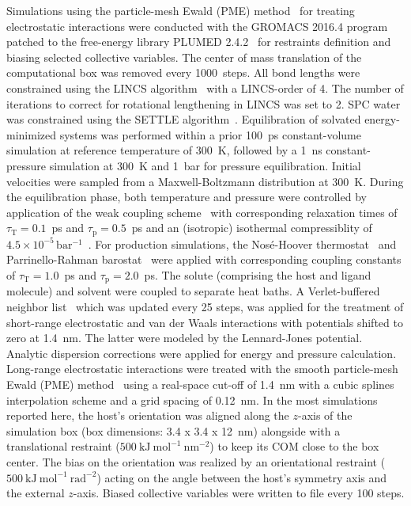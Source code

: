 \documentclass[9pt,lessons,pubversion]{livecoms}
\begin{document}
Simulations using the particle-mesh Ewald (PME) method~\cite{darden1993particle, essmann1995smooth} for treating electrostatic interactions were conducted with the 
GROMACS 2016.4 program~\cite{berendsen1995gromacs, hess2008gromacs, abraham2015gromacs} patched to the free-energy library 
PLUMED 2.4.2~\cite{tribello2014plumed} for restraints definition and biasing selected collective variables.
The center of mass translation of the computational box was removed every 1000~steps. 
All bond lengths were constrained using the LINCS algorithm~\cite{hess1997lincs, hess2008p} with a LINCS-order of 4. 
The number of iterations to correct for rotational lengthening in LINCS was set to 2.
SPC water was constrained using the SETTLE algorithm~\cite{miyamoto1992settle}.
Equilibration of solvated energy-minimized systems was performed within a prior 100~ps constant-volume simulation at reference temperature of 300~K, followed by a 1~ns constant-pressure simulation at 300~K and 1~bar for pressure equilibration.
Initial velocities were sampled from a Maxwell-Boltzmann distribution at 300~K.
During the equilibration phase, both temperature and pressure were controlled by application of the weak coupling scheme~\cite{berendsen1984molecular} with corresponding relaxation times of 
$\tau_\mathrm{T} = 0.1$~ps and $\tau_\mathrm{p} = 0.5$~ps and an (isotropic) isothermal compressiblity of $4.5\times 10^{-5}\,\mathrm{bar^{-1}}$~\cite{kell1967precise}.
For production simulations, the Nos\'{e}-Hoover thermostat~\cite{nose1984molecular, hoover1985canonical, martyna1996explicit} and Parrinello-Rahman barostat~\cite{parrinello1981polymorphic, nose1983constant} were applied with corresponding coupling constants of $\tau_\mathrm{T} = 1.0$~ps and $\tau_\mathrm{p} = 2.0$~ps.
The solute (comprising the host and ligand molecule) and solvent were coupled to separate heat baths.
A Verlet-buffered neighbor list~\cite{pall2013flexible} which was updated every 25 steps, was applied for the treatment of short-range electrostatic and van der Waals interactions with potentials shifted to zero at 1.4~nm. 
The latter were modeled by the Lennard-Jones potential.
Analytic dispersion corrections were applied for energy and pressure calculation.
Long-range electrostatic interactions were treated with the smooth particle-mesh Ewald (PME) method~\cite{darden1993particle, essmann1995smooth} using a real-space cut-off of 1.4~nm with a cubic splines interpolation scheme and a grid spacing of 0.12~nm.
In the most simulations reported here, the host's orientation was aligned along the $z$-axis of the simulation box (box dimensions: 3.4 x 3.4 x 12~nm) alongside with a translational 
restraint ($500~\mathrm{kJ~mol}^{-1}~\mathrm{nm}^{-2}$) to keep its COM close to the box center.
The bias on the orientation was realized by an orientational restraint ($500~\mathrm{kJ~mol^{-1}~rad^{-2}}$) acting on the angle between the host's symmetry axis and the external $z$-axis.
Biased collective variables were written to file every 100 steps.
\end{document}
